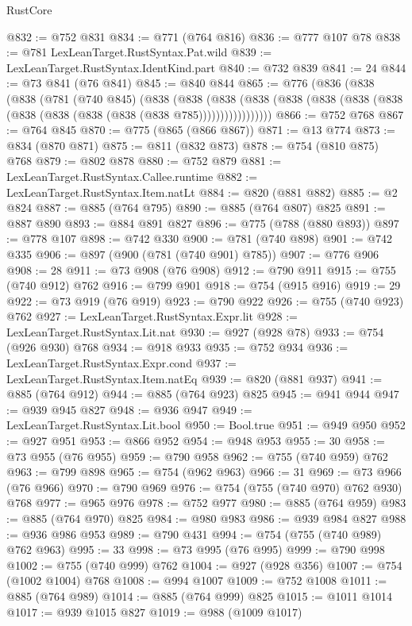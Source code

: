 \begin{lexlean}{RustCore}
\begin{coremodule}
@832 := @752 @831
@834 := @771 (@764 @816)
@836 := @777 @107 @78
@838 := @781 LexLeanTarget.RustSyntax.Pat.wild
@839 := LexLeanTarget.RustSyntax.IdentKind.part
@840 := @732 @839
@841 := 24
@844 := @73 @841 (@76 @841)
@845 := @840 @844
@865 := @776
    (@836
      (@838
        (@838
          (@781
            (@740 @845)
            (@838
              (@838
                (@838
                  (@838 (@838 (@838 (@838 (@838 (@838 (@838 (@838 (@838 (@838 @785)))))))))))))))))
@866 := @752 @768
@867 := @764 @845
@870 := @775 (@865 (@866 @867))
@871 := @13 @774
@873 := @834 (@870 @871)
@875 := @811 (@832 @873)
@878 := @754 (@810 @875) @768
@879 := @802 @878
@880 := @752 @879
@881 := LexLeanTarget.RustSyntax.Callee.runtime
@882 := LexLeanTarget.RustSyntax.Item.natLt
@884 := @820 (@881 @882)
@885 := @2 @824
@887 := @885 (@764 @795)
@890 := @885 (@764 @807) @825
@891 := @887 @890
@893 := @884 @891 @827
@896 := @775 (@788 (@880 @893))
@897 := @778 @107
@898 := @742 @330
@900 := @781 (@740 @898)
@901 := @742 @335
@906 := @897 (@900 (@781 (@740 @901) @785))
@907 := @776 @906
@908 := 28
@911 := @73 @908 (@76 @908)
@912 := @790 @911
@915 := @755 (@740 @912) @762
@916 := @799 @901
@918 := @754 (@915 @916)
@919 := 29
@922 := @73 @919 (@76 @919)
@923 := @790 @922
@926 := @755 (@740 @923) @762
@927 := LexLeanTarget.RustSyntax.Expr.lit
@928 := LexLeanTarget.RustSyntax.Lit.nat
@930 := @927 (@928 @78)
@933 := @754 (@926 @930) @768
@934 := @918 @933
@935 := @752 @934
@936 := LexLeanTarget.RustSyntax.Expr.cond
@937 := LexLeanTarget.RustSyntax.Item.natEq
@939 := @820 (@881 @937)
@941 := @885 (@764 @912)
@944 := @885 (@764 @923) @825
@945 := @941 @944
@947 := @939 @945 @827
@948 := @936 @947
@949 := LexLeanTarget.RustSyntax.Lit.bool
@950 := Bool.true
@951 := @949 @950
@952 := @927 @951
@953 := @866 @952
@954 := @948 @953
@955 := 30
@958 := @73 @955 (@76 @955)
@959 := @790 @958
@962 := @755 (@740 @959) @762
@963 := @799 @898
@965 := @754 (@962 @963)
@966 := 31
@969 := @73 @966 (@76 @966)
@970 := @790 @969
@976 := @754 (@755 (@740 @970) @762 @930) @768
@977 := @965 @976
@978 := @752 @977
@980 := @885 (@764 @959)
@983 := @885 (@764 @970) @825
@984 := @980 @983
@986 := @939 @984 @827
@988 := @936 @986 @953
@989 := @790 @431
@994 := @754 (@755 (@740 @989) @762 @963)
@995 := 33
@998 := @73 @995 (@76 @995)
@999 := @790 @998
@1002 := @755 (@740 @999) @762
@1004 := @927 (@928 @356)
@1007 := @754 (@1002 @1004) @768
@1008 := @994 @1007
@1009 := @752 @1008
@1011 := @885 (@764 @989)
@1014 := @885 (@764 @999) @825
@1015 := @1011 @1014
@1017 := @939 @1015 @827
@1019 := @988 (@1009 @1017)

\end{coremodule}
\end{lexlean}
